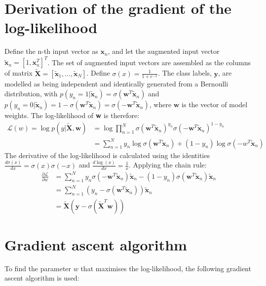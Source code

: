 \documentclass[a4paper]{article}
\begin{document}
    \section{Derivation of the gradient of the log-likelihood}\label{sec:gradient-derivation}
    Define the n-th input vector as $\textbf{x}_n$, and let the augmented input vector
    $\tilde{\textbf{x}}_n = \left[1, \textbf{x}_n^T \right]^T$.
    The set of augmented input vectors are assembled as the columns of matrix
    $\tilde{\textbf{X}} = [\tilde{\textbf{x}}_1, \dots, \tilde{\textbf{x}}_N]$.
    Define $\sigma(x) = \frac{1}{1 + e^{-x}}$.
    The class labels, $\textbf{y}$, are modelled as being independent and identically generated from a Bernoulli
    distribution, with $p (y_n = 1 | \tilde{\textbf{x}}_n ) = \sigma (\textbf{w}^T\tilde{\textbf{x}}_n)$ and
    $p (y_n = 0 | \tilde{\textbf{x}}_n ) = 1 - \sigma (\textbf{w}^T\tilde{\textbf{x}}_n) = \sigma (-\textbf{w}^T\tilde{\textbf{x}}_n)$,
    where $\textbf{w}$ is the vector of model weights.
    The log-likelihood of \textbf{w} is therefore:
    \begin{align*}
        \mathcal{L}(w) = \log p(y|\tilde{\textbf{X}}, \textbf{w})
        &= \log \prod_{n=1}^{N} \sigma( \textbf{w}^T \tilde{\textbf{x}}_n)^{y_n}
        \sigma (-\textbf{w}^T \tilde{\textbf{x}}_n)^{1-y_n} \\
        &= \sum_{n=1}^{N} y_n \log\sigma( \textbf{w}^T \tilde{\textbf{x}}_n) + (1-y_n) \log\sigma(-w^T \tilde{\textbf{x}}_n)
    \end{align*}
    The derivative of the log-likelihood is calculated using the identities $\frac{d\sigma(x)}{dx} = \sigma(x)\sigma(-x)$
    and $\frac{d\log(x)}{dx} = \frac{1}{x}$. Applying the chain rule:
    \begin{align*}
        \frac{\partial \mathcal{L}}{\partial w}
        &= \sum_{n=1}^{N} y_n \sigma(-\textbf{w}^T \tilde{\textbf{x}}_n) \tilde{\textbf{x}}_n - (1-y_n) \sigma(\textbf{w}^T \tilde{\textbf{x}}_n)  \tilde{\textbf{x}}_n \\
        &= \sum_{n=1}^{N} \left(y_n - \sigma(\textbf{w}^T \tilde{\textbf{x}}_n) \right)  \tilde{\textbf{x}}_n \\
        &= \tilde{\textbf{X}} (\textbf{y} - \sigma(\tilde{\textbf{X}}^T \textbf{w}))
    \end{align*}

    \section{Gradient ascent algorithm}\label{sec:gradient-ascent-algorithm}
    To find the parameter $w$ that maximises the log-likelihood, the following gradient ascent algorithm is used:
\end{document}
